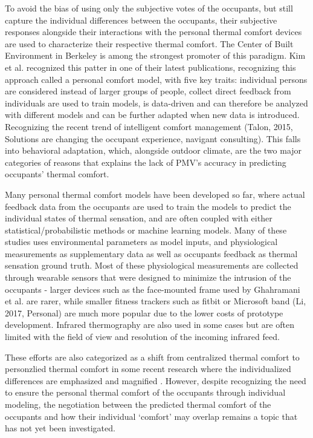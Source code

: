 To avoid the bias of using only the subjective votes of the occupants, but still capture the individual differences between the occupants, their subjective responses alongside their interactions with the personal thermal comfort devices are used to characterize their respective thermal comfort. The Center of Built Environment in Berkeley is among the strongest promoter of this paradigm. Kim et al. recognized this patter in one of their latest publications, recognizing this approach called a personal comfort model, with five key traits: individual persons are considered instead of larger groups of people, collect direct feedback from individuals are used to train models, is data-driven and can therefore be analyzed with different models and can be further adapted when new data is introduced. Recognizing the recent trend of intelligent comfort management (Talon, 2015, Solutions are changing the occupant experience, navigant consulting). This falls into behavioral adaptation, which, alongside outdoor climate, are the two major categories of reasons that explains the lack of PMV's accuracy in predicting occupants' thermal comfort\cite{charles_fangers_2003}. 

Many personal thermal comfort models have been developed so far, where actual feedback data from the occupants are used to train the models to predict the individual states of thermal sensation, and are often coupled with either statistical/probabilistic methods \cite{daum_personalized_2011} or machine learning models. Many of these studies uses environmental parameters as model inputs, and physiological measurements \cite{ghahramani_online_2015} as supplementary data as well as occupants feedback as thermal sensation ground truth\cite{liu_personal_2019}. Most of these physiological measurements are collected through wearable sensors that were designed to minimize the intrusion of the occupants - larger devices such as the face-mounted frame used by Ghahramani et al. \cite{ghahramani_infrared_2016} are rarer, while smaller fitness trackers such as fitbit or Microsoft band (Li, 2017, Personal) are much more popular due to the lower costs of prototype development. Infrared thermography are also used in some cases \cite{lu_thermal_2019} but are often limited with the field of view and resolution of the incoming infrared feed. 

These efforts are also categorized as a shift from centralized thermal comfort to personzlied thermal comfort in some recent research where the individualized differences are emphasized and magnified \cite{wang_individual_2018}. However, despite recognizing the need to ensure the personal thermal comfort of the occupants through individual modeling, the negotiation between the predicted thermal comfort of the occupants and how their individual `comfort' may overlap remains a topic that has not yet been investigated. 

